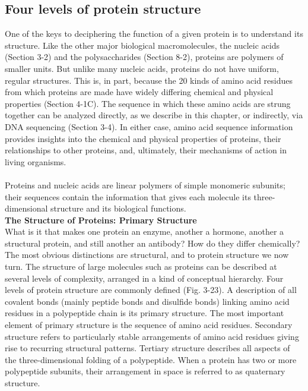 \subsection{Four levels of protein structure}\label{ssec:4-lev-prot-struc}
One of the keys to deciphering the function of a given protein is to understand its structure. Like the other major biological macromolecules, the nucleic acids (Section 3-2) and the polysaccharides (Section 8-2), proteins are polymers of smaller units. But unlike many nucleic acids, proteins do not have uniform, regular structures. This is, in part, because the 20 kinds of amino acid residues from which proteins are made have widely differing chemical and physical properties (Section 4-1C). The sequence in which these amino acids are strung together can be analyzed directly, as we describe in this chapter, or indirectly, via DNA sequencing (Section 3-4). In either case, amino acid sequence information provides insights into the chemical and physical properties of proteins, their relationships to other proteins, and, ultimately, their mechanisms of action in living organisms. 
\cite{voet2016fundamentals}\\
\\
Proteins and nucleic acids are linear polymers of simple monomeric subunits; their sequences contain the information that gives each molecule its three-dimensional structure and its biological functions.
\cite{nelson2008lehninger}
\\
\textbf{The Structure of Proteins: Primary Structure} \\
What is it that makes one protein an enzyme, another a hormone, another a structural protein, and still another an antibody? How do they differ chemically? The most obvious distinctions are structural, and to protein structure we now turn.
The structure of large molecules such as proteins can be described at several levels of complexity, arranged in a kind of conceptual hierarchy. Four levels of protein structure are commonly defined (Fig. 3-23). A description of all covalent bonds (mainly peptide bonds and disulfide bonds) linking amino acid residues in a polypeptide chain is its primary structure. The most important element of primary structure is the sequence of amino acid residues. Secondary structure refers to particularly stable arrangements of amino acid residues giving rise to recurring structural patterns. Tertiary structure describes all aspects of the three-dimensional folding of a polypeptide. When a protein has two or more polypeptide subunits, their arrangement in space is referred to as quaternary structure. 


